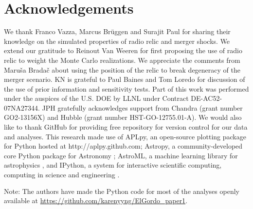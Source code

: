 \documentclass[ucdthesis.tex]{subfiles}
\begin{document}
    \section{Acknowledgements}
    We thank Franco Vazza, Marcus Br\"{u}ggen and Surajit Paul for sharing
    their knowledge on the simulated properties of radio relic and merger
    shocks. We extend our gratitude to Reinout Van Weeren for first proposing the use of
    radio relic to weight the Monte Carlo realizations. We appreciate the
    comments from Maru\v{s}a Brada\v{c} about using the position of the relic to
    break degeneracy of the merger scenario. KN is grateful to Paul Baines and
    Tom Loredo for discussion of the use of prior information and sensitivity tests. 
    Part of this work was performed under the auspices of the U.S. DOE by LLNL
    under Contract DE-AC52-07NA27344. 
    JPH gratefully acknowledges support from Chandra (grant number GO2-13156X)
    and Hubble (grant number HST-GO-12755.01-A).
    We would also like to thank 
    GitHub for providing free repository for version control for our data and
    analyses. This research made use of APLpy, an open-source plotting package for Python
    hosted at http://aplpy.github.com; Astropy, a community-developed core
    Python package for Astronomy \citep{astropy}; AstroML, a
    machine learning library for astrophysics \citep{VanderPlas2012}, and IPython, a system for
    interactive scientific computing, computing in science and engineering
    \citep{Perez2007}.\par
    Note: The authors have made the Python code for most of the analyses openly
    available at
    \href{https://github.com/karenyyng/ElGordo\_paper1}{https://github.com/karenyyng/ElGordo\_paper1}. 
		
		

      
\end{document}
